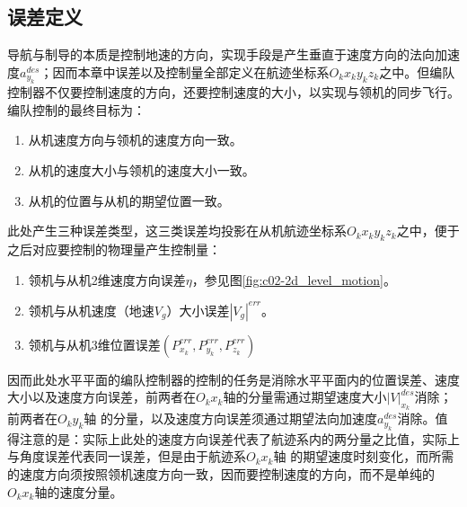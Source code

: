 \subsection{误差定义}
导航与制导的本质是控制地速的方向，实现手段是产生垂直于速度方向的法向加速度$a_{y_k}^{des}$；因而本章中误差以及控制量全部定义在航迹坐标系$O_kx_ky_kz_k$之中。但编队控制器不仅要控制速度的方向，还要控制速度的大小，以实现与领机的同步飞行。编队控制的最终目标为：
\begin{enumerate}
    \item 从机速度方向与领机的速度方向一致。
    \item 从机的速度大小与领机的速度大小一致。
    \item 从机的位置与从机的期望位置一致。
\end{enumerate}
此处产生三种误差类型，这三类误差均投影在从机航迹坐标系$O_kx_ky_kz_k$之中，便于之后对应要控制的物理量产生控制量：
\begin{enumerate}
    \item 领机与从机2维速度方向误差$\eta$，参见图\ref{fig:c02-2d_level_motion}。%
    \item 领机与从机速度（地速$V_g$）大小误差$|V_g|^{err}$。
    \item 领机与从机3维位置误差$(P_{x_k}^{err},P_{y_k}^{err},P_{z_k}^{err})$
\end{enumerate}
因而此处水平平面的编队控制器的控制的任务是消除水平平面内的位置误差、速度大小以及速度方向误差，前两者在$O_kx_k$轴的分量需通过期望速度大小${|V|}_{x_k}^{des}$消除；前两者在$O_ky_k$轴
的分量，以及速度方向误差须通过期望法向加速度$a_{y_k}^{des}$消除。值得注意的是：实际上此处的速度方向误差代表了航迹系内的两分量之比值，实际上与角度误差代表同一误差，但是由于航迹系$O_kx_k$轴
的期望速度时刻变化，而所需的速度方向须按照领机速度方向一致，因而要控制速度的方向，而不是单纯的$O_kx_k$轴的速度分量。
